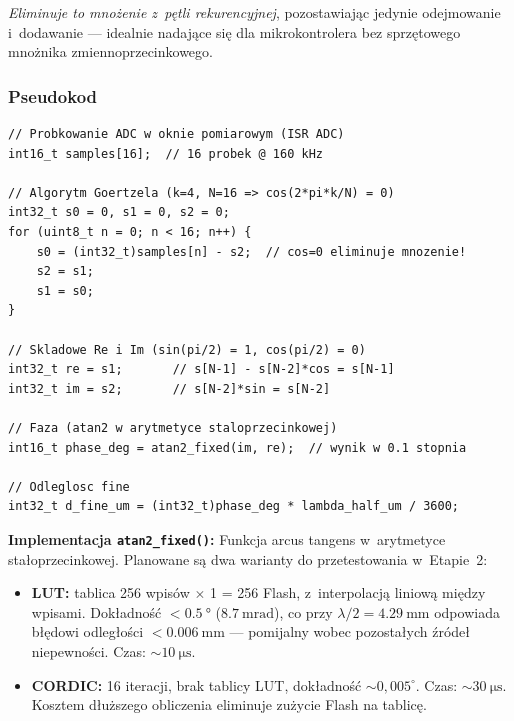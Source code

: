 \documentclass[a4paper,11pt]{article}
\begin{document}
\textit{Eliminuje to mnożenie z~pętli rekurencyjnej}, pozostawiając jedynie
odejmowanie i~dodawanie --- idealnie nadające się dla mikrokontrolera bez
sprzętowego mnożnika zmiennoprzecinkowego.

\subsubsection{Pseudokod}

\begin{lstlisting}[caption={Algorytm Goertzela --- uproszczony dla $k=4$, $N=16$},
                   label={lst:goertzel}]
// Probkowanie ADC w oknie pomiarowym (ISR ADC)
int16_t samples[16];  // 16 probek @ 160 kHz

// Algorytm Goertzela (k=4, N=16 => cos(2*pi*k/N) = 0)
int32_t s0 = 0, s1 = 0, s2 = 0;
for (uint8_t n = 0; n < 16; n++) {
    s0 = (int32_t)samples[n] - s2;  // cos=0 eliminuje mnozenie!
    s2 = s1;
    s1 = s0;
}

// Skladowe Re i Im (sin(pi/2) = 1, cos(pi/2) = 0)
int32_t re = s1;       // s[N-1] - s[N-2]*cos = s[N-1]
int32_t im = s2;       // s[N-2]*sin = s[N-2]

// Faza (atan2 w arytmetyce staloprzecinkowej)
int16_t phase_deg = atan2_fixed(im, re);  // wynik w 0.1 stopnia

// Odleglosc fine
int32_t d_fine_um = (int32_t)phase_deg * lambda_half_um / 3600;
\end{lstlisting}

\textbf{Implementacja \texttt{atan2\_fixed()}:} Funkcja arcus tangens
w~arytmetyce stałoprzecinkowej. Planowane są dwa warianty do przetestowania
w~Etapie~2:

\begin{itemize}[nosep]
    \item \textbf{LUT:} tablica 256 wpisów $\times$ \SI{1}{\byte}
          = \SI{256}{\byte} Flash, z~interpolacją liniową między wpisami.
          Dokładność $< \SI{0,5}{\degree}$ ($\SI{8,7}{\milli\radian}$),
          co przy $\lambda/2 = \SI{4,29}{\milli\metre}$ odpowiada błędowi
          odległości $< \SI{0,006}{\milli\metre}$ --- pomijalny wobec
          pozostałych źródeł niepewności. Czas: ${\sim}\SI{10}{\micro\second}$.
    \item \textbf{CORDIC:} 16 iteracji, brak tablicy LUT, dokładność
          ${\sim}0{,}005^{\circ}$. Czas: ${\sim}\SI{30}{\micro\second}$.
          Kosztem dłuższego obliczenia eliminuje zużycie Flash na tablicę.
\end{itemize}
\end{document}

